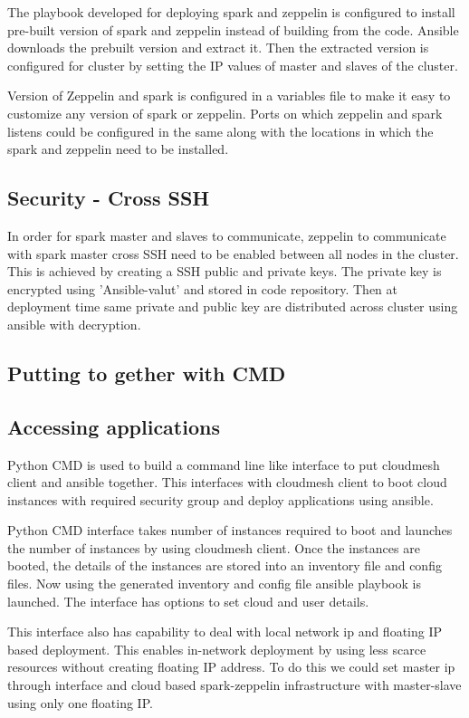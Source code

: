 \documentclass[9pt,twocolumn,twoside]{../../styles/osajnl}
\begin{document}
	The playbook developed for deploying spark and zeppelin is 
	configured to
	install pre-built version of spark and zeppelin instead of 
	building
	from the code. Ansible downloads the prebuilt version and extract
	it. Then the extracted version is configured for cluster by 
	setting
	the IP values of master and slaves of the cluster. 
	
	Version of Zeppelin and spark is configured in a variables file to
	make it easy to customize any version of spark or zeppelin. Ports 
	on
	which zeppelin and spark listens could be configured in the same
	along with the locations in which the spark and zeppelin need to 
	be installed. 
	
	\subsection{Security - Cross SSH}
	In order for spark master and slaves to communicate, zeppelin to
	communicate with spark master cross SSH need to be enabled 
	between all
	nodes in the cluster. This is achieved by creating a SSH public 
	and
	private keys. The private key is encrypted using 'Ansible-valut' 
	and
	stored in code repository. Then at deployment time same private 
	and
	public key are distributed across cluster using ansible with
	decryption. 
	
	\subsection{Putting to gether with CMD}
	
	\subsection{Accessing applications}
	Python CMD is used to build a command line like interface to put
	cloudmesh client and ansible together. This interfaces with 
	cloudmesh
	client to boot cloud instances with required security group and
	deploy applications using ansible.
	
	Python CMD interface takes number of instances required to boot 
	and
	launches the number of instances by using cloudmesh client. Once 
	the
	instances are booted, the details of the instances are stored 
	into an
	inventory file and config files. Now using the generated 
	inventory and
	config file ansible playbook is launched. The interface has 
	options to
	set cloud and user details.
	
	This interface also has capability to deal with local network ip 
	and
	floating IP based deployment. This enables in-network deployment 
	by
	using less scarce resources without creating floating IP address. 
	To do this
	we could set master ip through interface and cloud based
	spark-zeppelin infrastructure with master-slave using only one
	floating IP.
	
\end{document}
